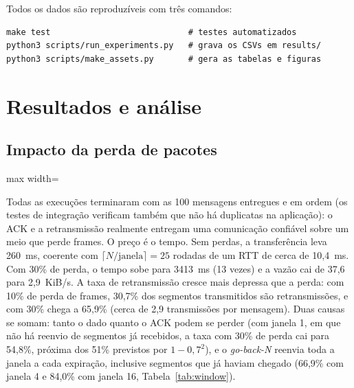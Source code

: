 \documentclass[11pt,a4paper]{article}
\begin{document}
\begin{minipage}{\textwidth}
Todos os dados s\~ao reproduz\'iveis com tr\^es comandos:

\begin{lstlisting}
make test                            # testes automatizados
python3 scripts/run_experiments.py   # grava os CSVs em results/
python3 scripts/make_assets.py       # gera as tabelas e figuras
\end{lstlisting}
\end{minipage}

\section{Resultados e an\'alise}

\subsection{Impacto da perda de pacotes}

\begin{table}[H]
\centering\small
\begin{adjustbox}{max width=\textwidth}\end{adjustbox}
\caption{Perda de frames, modo confi\'avel (m\'edia e desvio de 3 execu\c{c}\~oes).}
\label{tab:loss}
\end{table}

Todas as execu\c{c}\~oes terminaram com as 100 mensagens entregues e em ordem (os testes de integra\c{c}\~ao verificam tamb\'em que n\~ao h\'a duplicatas na aplica\c{c}\~ao): o ACK e a retransmiss\~ao realmente entregam uma comunica\c{c}\~ao confi\'avel sobre um meio que perde frames. O pre\c{c}o \'e o tempo. Sem perdas, a transfer\^encia leva 260~ms, coerente com $\lceil N/\text{janela} \rceil = 25$ rodadas de um RTT de cerca de 10,4~ms. Com 30\% de perda, o tempo sobe para 3413~ms (13 vezes) e a vaz\~ao cai de 37,6 para 2,9~KiB/s. A taxa de retransmiss\~ao cresce mais depressa que a perda: com 10\% de perda de frames, 30,7\% dos segmentos transmitidos s\~ao retransmiss\~oes, e com 30\% chega a 65,9\% (cerca de 2,9 transmiss\~oes por mensagem). Duas causas se somam: tanto o dado quanto o ACK podem se perder (com janela 1, em que n\~ao h\'a reenvio de segmentos j\'a recebidos, a taxa com 30\% de perda cai para 54,8\%, pr\'oxima dos 51\% previstos por $1 - 0{,}7^2$), e o \emph{go-back-N} reenvia toda a janela a cada expira\c{c}\~ao, inclusive segmentos que j\'a haviam chegado (66,9\% com janela 4 e 84,0\% com janela 16, Tabela~\ref{tab:window}).
\end{document}
